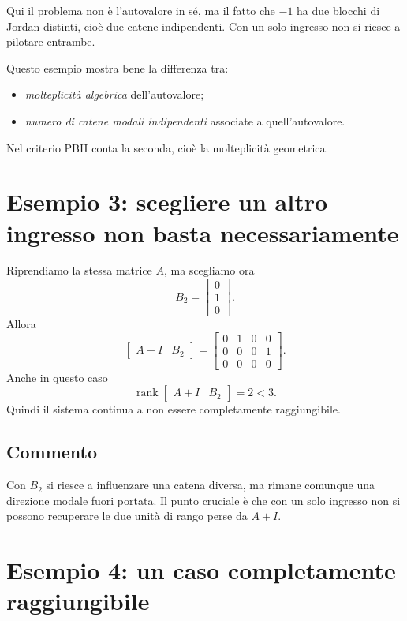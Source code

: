 Qui il problema non è l’autovalore in sé, ma il fatto che \(-1\) ha due blocchi di Jordan distinti, cioè due catene indipendenti. Con un solo ingresso non si riesce a pilotare entrambe.

\begin{osservazione}
Questo esempio mostra bene la differenza tra:
\begin{itemize}
    \item \emph{molteplicità algebrica} dell’autovalore;
    \item \emph{numero di catene modali indipendenti} associate a quell’autovalore.
\end{itemize}
Nel criterio PBH conta la seconda, cioè la molteplicità geometrica.
\end{osservazione}

\section{Esempio 3: scegliere un altro ingresso non basta necessariamente}

Riprendiamo la stessa matrice \(A\), ma scegliamo ora
\[
B_2=
\begin{bmatrix}
0\\
1\\
0
\end{bmatrix}.
\]
Allora
\[
\begin{bmatrix}
A+I & B_2
\end{bmatrix}
=
\begin{bmatrix}
0 & 1 & 0 & 0\\
0 & 0 & 0 & 1\\
0 & 0 & 0 & 0
\end{bmatrix}.
\]
Anche in questo caso
\[
\operatorname{rank}
\begin{bmatrix}
A+I & B_2
\end{bmatrix}
=2<3.
\]
Quindi il sistema continua a non essere completamente raggiungibile.

\subsection*{Commento}

Con \(B_2\) si riesce a influenzare una catena diversa, ma rimane comunque una direzione modale fuori portata.  
Il punto cruciale è che con un solo ingresso non si possono recuperare le due unità di rango perse da \(A+I\).

\section{Esempio 4: un caso completamente raggiungibile}

